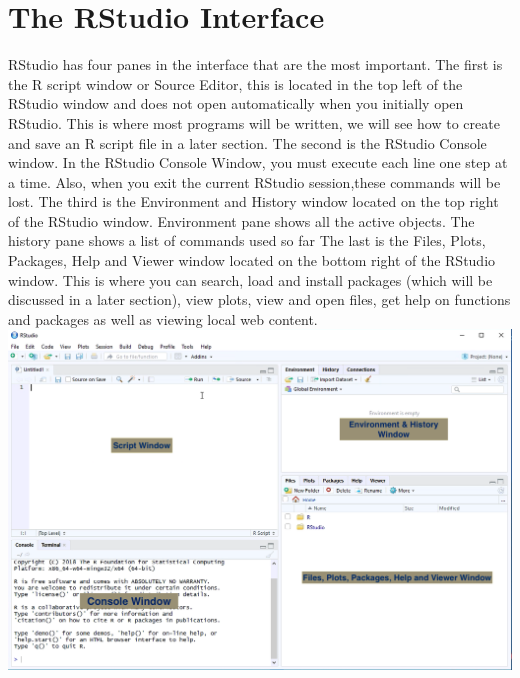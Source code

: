 \documentclass[a4paper]{report}
\begin{document}
    \section{The RStudio Interface}

        \begin{flushleft}
            RStudio has four panes in the interface that are the most important. The first is the R script window or Source Editor, this is located in the top left of the RStudio window and does not open automatically when you initially open RStudio. This is where most programs will be written, we will see how to create and save an R script file in a later section.  
            \newline \newline
            The second is the RStudio Console window. In the RStudio Console Window, you must execute each line one step at a time. Also, when you exit the current RStudio session,these commands will be lost. 
            \newline \newline
            The third is the Environment and History window located on the top right of the RStudio window. Environment pane shows all the active objects. The history pane shows a list of commands used so far 
            \newline \newline
            The last is the Files, Plots, Packages, Help and Viewer window located on the bottom right of the RStudio window. This is where you can search, load and install packages (which will be discussed in a later section), view plots, view and open files, get help on functions and packages as well as viewing local web content. 
             \includegraphics[width=\textwidth]{images/GS4.png}
        \end{flushleft}
       
\end{document}
